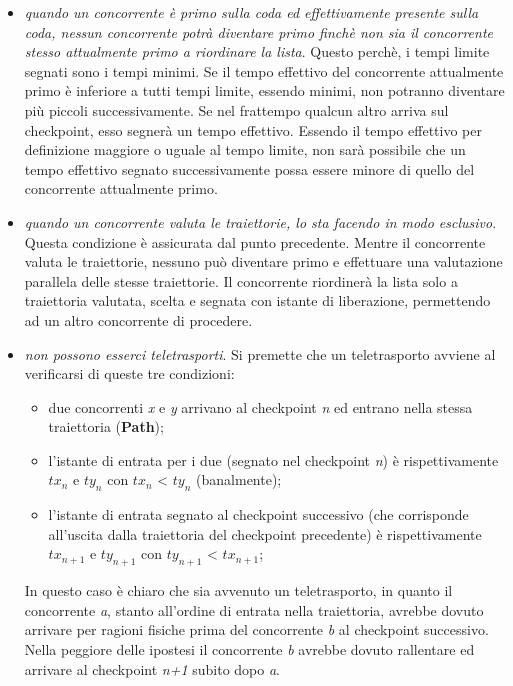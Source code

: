 \begin{itemize}
\item \emph{quando un concorrente \`{e} primo sulla coda ed effettivamente
presente sulla coda, nessun concorrente potr\`{a} diventare primo finch\`{e} non
sia il concorrente
stesso attualmente primo a riordinare la lista}. Questo perch\`{e}, i tempi
limite segnati sono i tempi minimi. Se il tempo effettivo del concorrente
attualmente
primo \`{e} inferiore a tutti tempi limite, essendo minimi, non potranno
diventare pi\`{u} piccoli successivamente. Se nel frattempo qualcun altro arriva
sul 
checkpoint, esso segner\`{a} un tempo effettivo. Essendo il tempo effettivo per
definizione maggiore o uguale al tempo limite, non sar\`{a} possibile che un
tempo
effettivo segnato successivamente possa essere minore di quello del concorrente
attualmente primo.
\item \emph{quando un concorrente valuta le traiettorie, lo sta facendo in modo
esclusivo}. Questa condizione \`{e} assicurata dal punto precedente. Mentre il 
concorrente valuta le traiettorie, nessuno pu\`{o} diventare primo e effettuare
una valutazione parallela delle stesse traiettorie. Il concorrente
riordiner\`{a}
la lista solo a traiettoria valutata, scelta e segnata con istante di
liberazione, permettendo ad un altro concorrente di procedere.
\item \emph{non possono esserci teletrasporti}. 
Si premette che un teletrasporto avviene al verificarsi di queste tre condizioni:
\begin{itemize}
\item due concorrenti \emph{x} e \emph{y} arrivano al checkpoint \emph{n} ed entrano nella stessa traiettoria (\textbf{Path});
\item l'istante di entrata per i due (segnato nel checkpoint \emph{n}) è rispettivamente \emph{$tx_n$} e \emph{$ty_n$} con \emph{$tx_n$} < \emph{$ty_n$} (banalmente);
\item l'istante di entrata segnato al checkpoint successivo (che corrisponde all'uscita dalla traiettoria del checkpoint precedente) è
rispettivamente \emph{$tx_{n+1}$} e \emph{$ty_{n+1}$} con \emph{$ty_{n+1}$} < \emph{$tx_{n+1}$};
\end{itemize}
In questo caso è chiaro che sia avvenuto un teletrasporto, in quanto il concorrente \emph{a}, stanto all'ordine di entrata nella
traiettoria, avrebbe dovuto arrivare per ragioni fisiche prima del concorrente \emph{b} al checkpoint successivo. Nella peggiore 
delle ipostesi il concorrente \emph{b} avrebbe dovuto rallentare ed arrivare al checkpoint \emph{n+1} subito dopo \emph{a}. 

\end{itemize}
